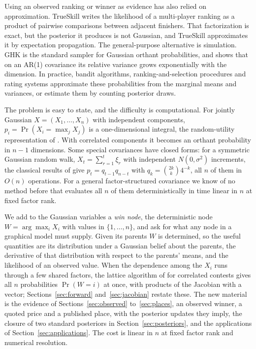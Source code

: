 \documentclass[11pt]{article}
\begin{document}
Using an observed ranking or winner as evidence has also relied on
approximation. TrueSkill \citep{herbrich2007} writes the likelihood
of a multi-player ranking as a product of pairwise comparisons
between adjacent finishers. That factorization is exact, but the
posterior it produces is not Gaussian, and TrueSkill approximates it
by expectation propagation. The general-purpose alternative is
simulation. GHK is the standard sampler for Gaussian orthant
probabilities, and \citet{ridgway2016} shows that on an AR(1)
covariance its relative variance grows exponentially with the
dimension. In practice, bandit algorithms, ranking-and-selection
procedures and rating systems approximate these probabilities from
the marginal means and variances, or estimate them by counting
posterior draws.

The problem is easy to state, and the difficulty is computational.
For jointly Gaussian $X=(X_1,\dots,X_n)$ with independent components,
$p_i=\Pr(X_i=\max_j X_j)$ is a one-dimensional integral, the
random-utility representation of \citet{domencich1975}. With
correlated components it becomes an orthant probability in $n-1$
dimensions. Some special covariances have closed forms: for a
symmetric Gaussian random walk, $X_t=\sum_{r=1}^{t}\xi_r$ with
independent $N(0,\sigma^2)$ increments, the classical results of
\citet{andersen1953} give $p_t=q_{t-1}q_{n-t}$ with
$q_k=\binom{2k}{k}4^{-k}$, all $n$ of them in $O(n)$ operations. For a
general factor-structured covariance we know of no method before
\citet{cotton2026} that evaluates all $n$ of them deterministically in
time linear in $n$ at fixed factor rank.

We
add to the Gaussian variables a \emph{win node}, the deterministic
node $W=\arg\max_i X_i$ with values in $\{1,\dots,n\}$, and ask for
what any node in a graphical model must supply. Given its parents
$W$ is determined, so the useful quantities are its distribution
under a Gaussian belief about the parents, the derivative of that
distribution with respect to the parents' means, and the likelihood
of an observed value. When
the dependence among the $X_i$ runs through a few shared factors, the
lattice algorithm of \citet{cotton2026} for correlated contests gives
all $n$ probabilities $\Pr(W=i)$ at once, with products of the
Jacobian with a vector; Sections~\ref{sec:forward}
and~\ref{sec:jacobian} restate these. The new material is the
evidence of Sections~\ref{sec:observed} to~\ref{sec:places}, an
observed winner, a quoted price and a published place, with the
posterior updates they imply, the closure of two standard posteriors in
Section~\ref{sec:posteriors}, and the applications of
Section~\ref{sec:applications}. The cost is linear in $n$ at fixed
factor rank and numerical resolution.
\end{document}
